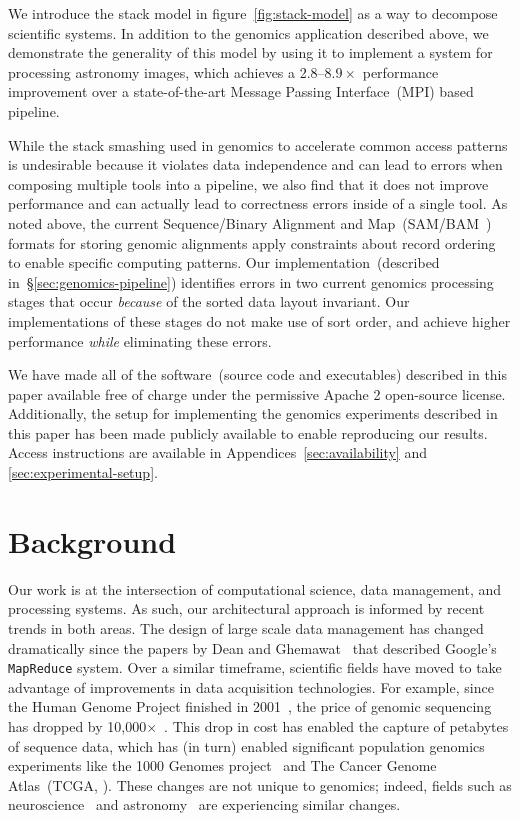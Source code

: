 \documentclass{acm_proc_article-sp}
\begin{document}
We introduce the stack model in figure~\ref{fig:stack-model} as a way to decompose scientific systems. In
addition to the genomics application described above, we demonstrate the generality of this model by using it to
implement a system for processing astronomy images, which achieves a 2.8--$8.9\times$ performance
improvement over a state-of-the-art Message Passing Interface~(MPI) based pipeline.

While the stack smashing used in genomics to accelerate common access patterns is undesirable because it
violates data independence and can lead to errors when composing multiple tools into a pipeline, we also find
that it does not improve performance and can actually lead to correctness errors inside of a single tool. As noted
above, the current Sequence/Binary Alignment and Map~(SAM/BAM~\cite{li09}) formats for storing
genomic alignments apply constraints about record ordering to enable specific computing patterns. Our
implementation~(described in~\S\ref{sec:genomics-pipeline}) identifies errors in two current genomics
processing stages that occur \emph{because} of the sorted data layout invariant. Our implementations of
these stages do not make use of sort order, and achieve higher performance \emph{while} eliminating
these errors.

We have made all of the software~(source code and executables) described in this paper available free
of charge under the permissive Apache 2 open-source license. Additionally, the setup for implementing the
genomics experiments described in this paper has been made publicly available to enable reproducing our
results. Access instructions are available in Appendices~\ref{sec:availability} and \ref{sec:experimental-setup}.

\section{Background}
\label{sec:background}

Our work is at the intersection of computational science, data management, and processing
systems. As such, our architectural approach is informed by recent trends in both areas. The design of
large scale data management has changed dramatically since the papers by Dean and
Ghemawat~\cite{dean04, dean08} that described Google's \texttt{MapReduce} system. Over a
similar timeframe, scientific fields have moved to take advantage of improvements in data acquisition
technologies. For example, since the Human Genome Project finished in 2001~\cite{lander01}, the price
of genomic sequencing has dropped by 10,000$\times$~\cite{nhgri}. This drop in cost has enabled the
capture of petabytes of sequence data, which has (in turn) enabled significant population genomics
experiments like the 1000 Genomes project~\cite{siva08} and The Cancer Genome Atlas~(TCGA,
\cite{weinstein13}). These changes are not unique to genomics; indeed, fields such as
neuroscience~\cite{cunningham14} and astronomy~\cite{lsst2008, turk11, sdss2000} are experiencing similar
changes.
\end{document}
